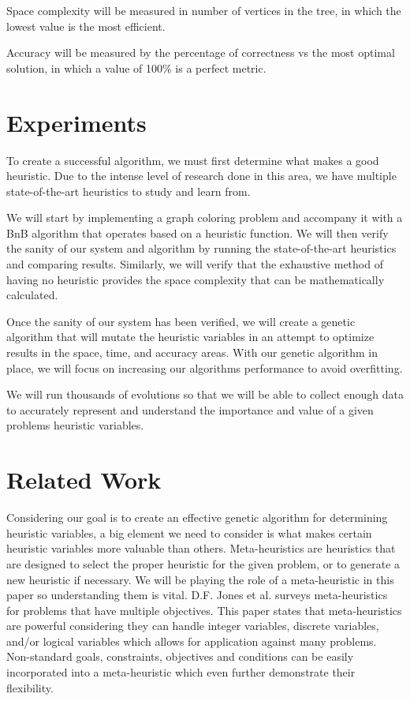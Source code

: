 \documentclass[10pt,twoside]{IEEEtran}
\begin{document}
Space complexity will be measured in number of vertices in the tree, in which the lowest value is the most efficient.

Accuracy will be measured by the percentage of correctness vs the most optimal solution, in which a value of 100\% is a perfect metric.

\section{Experiments} \label{Experiments}
To create a successful algorithm, we must first determine what makes a good heuristic. Due to the intense level of research done in this area, we have multiple state-of-the-art heuristics to study and learn from.

We will start by implementing a graph coloring problem and accompany it with a BnB algorithm that operates based on a heuristic function. We will then verify the sanity of our system and algorithm by running the state-of-the-art heuristics and comparing results. Similarly, we will verify that the exhaustive method of having no heuristic provides the space complexity that can be mathematically calculated.

Once the sanity of our system has been verified, we will create a genetic algorithm that will mutate the heuristic variables in an attempt to optimize results in the space, time, and accuracy areas. With our genetic algorithm in place, we will focus on increasing our algorithms performance to avoid overfitting.

We will run thousands of evolutions so that we will be able to collect enough data to accurately represent and understand the importance and value of a given problems heuristic variables.

\section{Related Work}
Considering our goal is to create an effective genetic algorithm for determining heuristic variables, a big element we need to consider is what makes certain heuristic variables more valuable than others. Meta-heuristics are heuristics that are designed to select the proper heuristic for the given problem, or to generate a new heuristic if necessary. We will be playing the role of a meta-heuristic in this paper so understanding them is vital. D.F. Jones et al. \cite{JONES20021} surveys meta-heuristics for problems that have multiple objectives. This paper states that meta-heuristics are powerful considering they can handle integer variables, discrete variables, and/or logical variables which allows for application against many problems. Non-standard goals, constraints, objectives and conditions can be easily incorporated into a meta-heuristic which even further demonstrate their flexibility.
\end{document}
